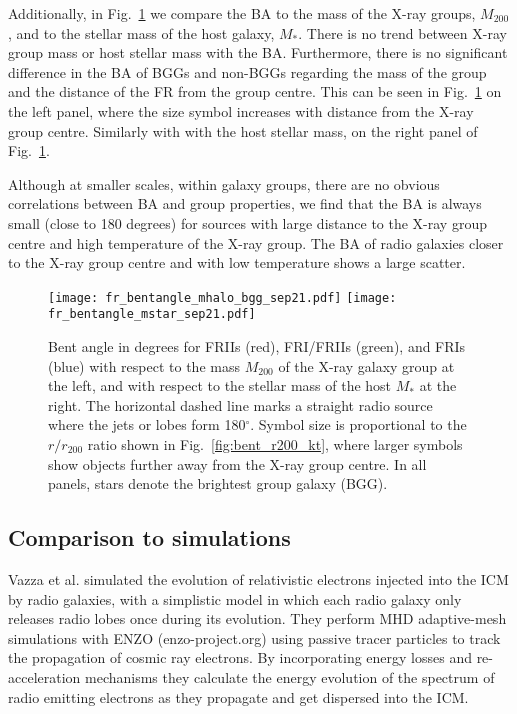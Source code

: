\documentclass[galaxies,article,submit,moreauthors,pdftex]{Definitions/mdpi}
\begin{document}
Additionally, in Fig.~\ref{fig:bent_mhalo} we compare the BA to the mass of the X-ray groups, $M_{200}$, and to the stellar mass of the host galaxy, $M_{*}$. There is no trend between X-ray group mass or host stellar mass with the BA. Furthermore, there is no significant difference in the BA of BGGs and non-BGGs regarding the mass of the group and the distance of the FR from the group centre. This can be seen in Fig.~\ref{fig:bent_mhalo} on the left panel, where the size symbol increases with distance from the X-ray group centre. Similarly with with the host stellar mass, on the right panel of Fig.~\ref{fig:bent_mhalo}. 


Although at smaller scales, within galaxy groups, there are no obvious correlations between BA and group properties, we find that the BA is always small (close to 180 degrees) for sources with large distance to the X-ray group centre and high temperature of the X-ray group. The BA of radio galaxies closer to the X-ray group centre and with low temperature shows a large scatter. 


   \begin{figure}[!ht]
  \resizebox{\hsize}{!}
 {\texttt{[image: fr\_bentangle\_mhalo\_bgg\_sep21.pdf]}
 \texttt{[image: fr\_bentangle\_mstar\_sep21.pdf]}
            }
\caption{Bent angle in degrees for FRIIs (red), FRI/FRIIs (green), and FRIs (blue)  with respect to the mass $M_{200}$ of the X-ray galaxy group \citep{gozaliasl19, vardoulaki21b} at the left, and with respect to the stellar mass of the host $M_{*}$ at the right. The horizontal dashed line marks a straight radio source where the jets or lobes form 180$^{\circ}$. Symbol size is proportional to the $r/r_{200}$ ratio shown in Fig.~\ref{fig:bent_r200_kt}, where larger symbols show objects further away from the X-ray group centre. In all panels, stars denote the brightest group galaxy (BGG).
   }
              \label{fig:bent_mhalo}%
    \end{figure} 
            
            


\subsection{Comparison to simulations}

Vazza et al. \citep{vazza21} simulated the evolution of relativistic electrons injected into the ICM by radio galaxies, with a simplistic model in which each radio galaxy only releases radio lobes once during its evolution. They perform MHD adaptive-mesh simulations with ENZO (enzo-project.org) using passive tracer particles to track the propagation of cosmic ray electrons. By incorporating energy losses and re-acceleration mechanisms they calculate the energy evolution of the spectrum of radio emitting electrons as they propagate and get dispersed into the ICM. 
\end{document}

